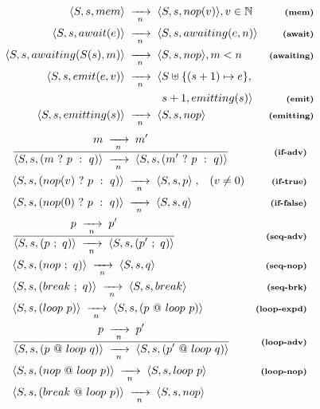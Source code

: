 \documentclass{acm_proc_article-sp}
\newcommand{\ST}{\1\xrightarrow[~n~]{}\1}
\newcommand{\LL}{\langle}
\newcommand{\RR}{\rangle}
\newcommand{\DS}{\displaystyle}
\newcommand{\rr}[1] {{\textbf{\scriptsize{#1}}}}
\newcommand{\1}{\;}
\newcommand{\2}{\;\;}
\newcommand{\3}{\;\;\;}
\newcommand{\5}{\;\;\;\;\;}
\begin{document}
\begin{figure}
%
{ \setlength{\jot}{7pt}
\begin{align*}
\LL S,s, mem \RR &\ST
\LL S,s, nop(v) \RR, v \in \mathbb{N}
    & \rr{(mem)}        \\
\LL S,s, await(e) \RR &\ST
\LL S,s, awaiting(e,n) \RR
    & \rr{(await)}      \\
\LL S,s, awaiting(S(s),m) \RR &\ST
\LL S,s, nop \RR, m<n
    & \rr{(awaiting)}   \\
\LL S,s, emit(e,v) \RR &\ST
\LL S \uplus \{(s+1) \mapsto e\}, \\
&~~~~~~~~~~s+1, emitting(s) \RR
    & \rr{(emit)}       \\
\LL S,s, emitting(s) \RR &\ST
\LL S,s, nop \RR
    & \rr{(emitting)}
\end{align*}
}
%
{ %
\begin{eqnarray*}
& \frac
    {\DS m \ST m' }
    {\DS \LL S,s, (m~?~p~:~q) \RR \ST
         \LL S,s, (m'~?~p~:~q)\RR }
    & \rr{(if-adv)}       \\
& \LL S,s, (nop(v)~?~p~:~q) \RR \ST
  \LL S,s,  p \RR \1,\3 (v \neq 0)
    & \rr{(if-true)}       \\
& \LL S,s, (nop(0)~?~p~:~q) \RR \ST
  \LL S,s, q \RR
    & \rr{(if-false)}       \\
& \frac
    {\DS p \ST p' }
    {\DS \LL S,s, (p~;~q) \RR \ST \LL S,s, (p'~;~q) \RR }
    & \rr{(seq-adv)}      \\
& \LL S,s, (nop~;~q) \RR \ST  \LL S,s, q \RR
    & \rr{(seq-nop)}      \\
& \LL S,s, (break~;~q) \RR \ST \LL S,s, break \RR
    & \rr{(seq-brk)}      \\
%
& \LL S,s, (loop~p) \RR \ST \LL S,s, (p~@~loop~p) \RR
    & \rr{(loop-expd)}       \\
& \frac
    {\DS p \ST p' }
    {\DS \LL S,s, (p~@~loop~q) \RR \ST \LL S,s, (p'~@~loop~q) \RR }
    & \rr{(loop-adv)}    \\
& \LL S,s, (nop~@~loop~p) \RR \ST \LL S,s, loop~p \RR
    & \rr{(loop-nop)}    \\
& \LL S,s, (break~@~loop~p) \RR \ST \LL S,s, nop \RR

\end{eqnarray*}}
\end{figure}
\end{document}
